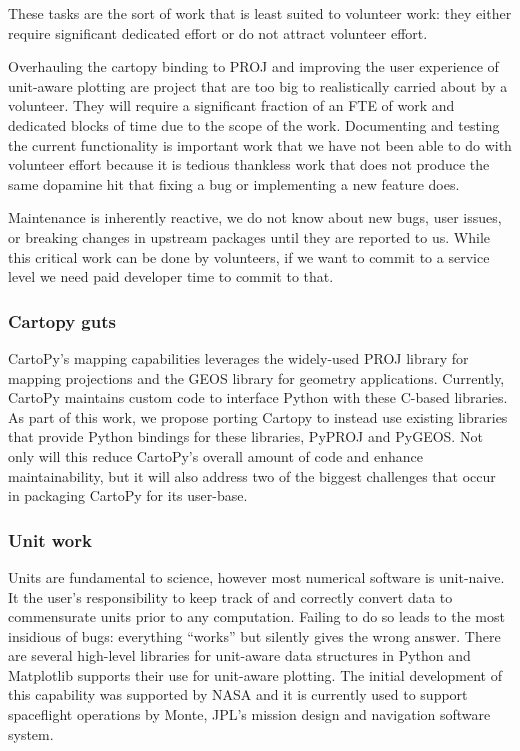 \documentclass[12pt]{article}
\numberwithin{page}{section}
\begin{document}
These tasks are the sort of work that is least suited to volunteer
work: they either require significant dedicated effort or do not
attract volunteer effort.

Overhauling the cartopy binding to PROJ and improving the user
experience of unit-aware plotting are project that are too big to
realistically carried about by a volunteer.  They will require a
significant fraction of an FTE of work and dedicated blocks of time
due to the scope of the work.  Documenting and testing the current
functionality is important work that we have not been able to do with
volunteer effort because it is tedious thankless work that does not
produce the same dopamine hit that fixing a bug or implementing a new
feature does.

Maintenance is inherently reactive, we do not know about new bugs,
user issues, or breaking changes in upstream packages until they are
reported to us.  While this critical work can be done by volunteers,
if we want to commit to a service level we need paid developer time to
commit to that.


\subsubsection{Cartopy guts}
CartoPy's mapping capabilities leverages the widely-used PROJ library
for mapping projections and the GEOS library for geometry
applications. Currently, CartoPy maintains custom code to interface
Python with these C-based libraries. As part of this work, we propose
porting Cartopy to instead use existing libraries that provide Python
bindings for these libraries, PyPROJ and PyGEOS. Not only will this
reduce CartoPy's overall amount of code and enhance maintainability,
but it will also address two of the biggest challenges that occur in
packaging CartoPy for its user-base.


\subsubsection{Unit work}

Units are fundamental to science, however most numerical software is
unit-naive.  It the user's responsibility to keep track of and
correctly convert data to commensurate units prior to any computation.
Failing to do so leads to the most insidious of bugs: everything
``works'' but silently gives the wrong answer.  There are several
high-level libraries for unit-aware data structures in Python and
Matplotlib supports their use for unit-aware plotting.  The initial
development of this capability was supported by NASA and it is
currently used to support spaceflight operations by Monte, JPL's
mission design and navigation software system.
\end{document}
